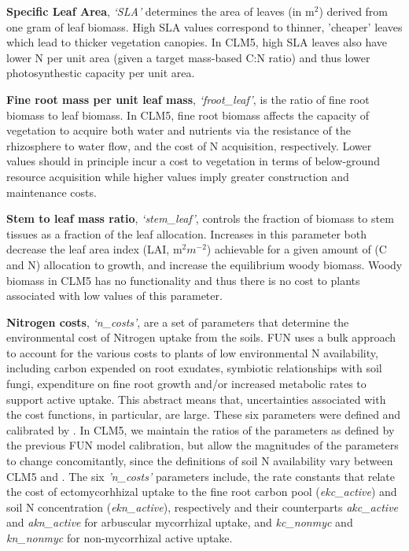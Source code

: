 \documentclass[draft,linenumbers]{agujournal}
\begin{document}
\textbf{Specific Leaf Area}, \emph{`SLA'} determines the area of leaves (in m$^{2}$) derived from one gram of leaf biomass. High SLA values correspond to thinner, 'cheaper' leaves which lead to thicker vegetation canopies. In CLM5, high SLA leaves also have lower N per unit area (given a target mass-based C:N ratio) and thus lower photosynthestic capacity per unit area.

\textbf{Fine root mass per unit leaf mass}, \emph{`froot\_leaf'}, is the ratio of fine root biomass to leaf biomass. In CLM5, fine root biomass affects the capacity of vegetation to acquire both water and nutrients via the resistance of the rhizosphere to water flow, and the cost of N acquisition, respectively. Lower values should in principle incur a cost to vegetation in terms of below-ground resource acquisition while higher values imply greater construction and maintenance costs.  

 \textbf{Stem to leaf mass ratio}, \emph{`stem\_leaf'}, controls the fraction of biomass to stem tissues as a fraction of the leaf allocation. Increases in this parameter both decrease the leaf area index (LAI, m$^{2} m^{-2}$) achievable for a given amount of (C and N) allocation to growth, and increase the equilibrium woody biomass. Woody biomass in CLM5 has no functionality and thus there is no cost to plants associated with low values of this parameter.

\textbf{Nitrogen costs}, \emph{`n\_costs'}, are a set of parameters that determine the environmental cost of Nitrogen uptake from the soils. FUN uses a bulk approach to account for the various costs to plants of low environmental N availability, including carbon expended on root exudates, symbiotic relationships with soil fungi, expenditure on fine root growth and/or increased metabolic rates to support active uptake. This abstract means that, uncertainties associated with the cost functions, in particular, are large. These six parameters were defined and calibrated by \cite{brzostek2014}. In CLM5, we maintain the ratios of the parameters as defined by the previous FUN model calibration, but allow the magnitudes of the parameters to change concomitantly, since the definitions of soil N availability vary between CLM5 and \cite{brzostek2014}. The six \emph{'n\_costs'} parameters include, the rate constants that relate the cost of ectomycorhhizal uptake to the fine root carbon pool (\emph{ekc\_active}) and soil N concentration (\emph{ekn\_active}), respectively and their counterparts \emph{akc\_active} and \emph{akn\_active} for arbuscular mycorrhizal uptake, and \emph{kc\_nonmyc} and \emph{kn\_nonmyc} for non-mycorrhizal active uptake. 
\end{document}
